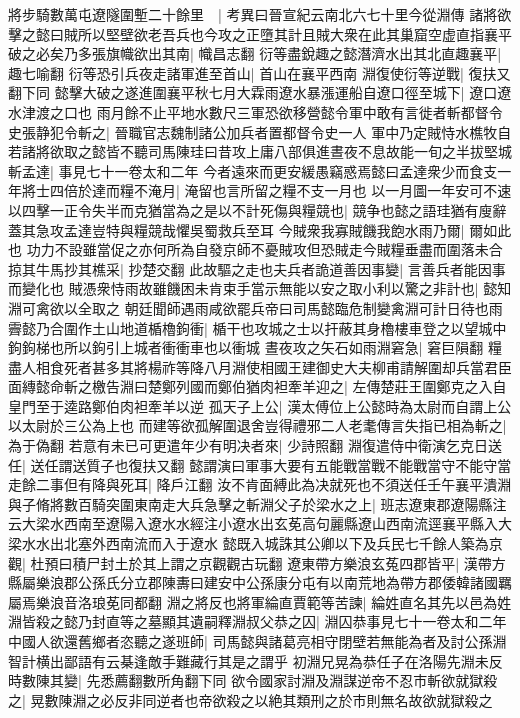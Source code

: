 將步騎數萬屯遼隧圍塹二十餘里　|{
	考異曰晉宣紀云南北六七十里今從淵傳}
諸將欲擊之懿曰賊所以堅壁欲老吾兵也今攻之正墮其計且賊大衆在此其巢窟空虚直指襄平破之必矣乃多張旗幟欲出其南|{
	幟昌志翻}
衍等盡銳趣之懿潛濟水出其北直趣襄平|{
	趣七喻翻}
衍等恐引兵夜走諸軍進至首山|{
	首山在襄平西南}
淵復使衍等逆戰|{
	復扶又翻下同}
懿擊大破之遂進圍襄平秋七月大霖雨遼水暴漲運船自遼口徑至城下|{
	遼口遼水津渡之口也}
雨月餘不止平地水數尺三軍恐欲移營懿令軍中敢有言徙者斬都督令史張静犯令斬之|{
	晉職官志魏制諸公加兵者置都督令史一人}
軍中乃定賊恃水樵牧自若諸將欲取之懿皆不聽司馬陳珪曰昔攻上庸八部俱進晝夜不息故能一旬之半拔堅城斬孟達|{
	事見七十一卷太和二年}
今者遠來而更安緩愚竊惑焉懿曰孟達衆少而食支一年將士四倍於達而糧不淹月|{
	淹留也言所留之糧不支一月也}
以一月圖一年安可不速以四擊一正令失半而克猶當為之是以不計死傷與糧競也|{
	競争也懿之語珪猶有廋辭蓋其急攻孟達豈特與糧競哉懼吳蜀救兵至耳}
今賊衆我寡賊饑我飽水雨乃爾|{
	爾如此也}
功力不設雖當促之亦何所為自發京師不憂賊攻但恐賊走今賊糧垂盡而圍落未合掠其牛馬抄其樵采|{
	抄楚交翻}
此故驅之走也夫兵者詭道善因事變|{
	言善兵者能因事而變化也}
賊憑衆恃雨故雖饑困未肯束手當示無能以安之取小利以驚之非計也|{
	懿知淵可禽欲以全取之}
朝廷聞師遇雨咸欲罷兵帝曰司馬懿臨危制變禽淵可計日待也雨霽懿乃合圍作土山地道楯櫓鉤衝|{
	楯干也攻城之士以扞蔽其身櫓樓車登之以望城中鉤鉤梯也所以鉤引上城者衝衝車也以衝城}
晝夜攻之矢石如雨淵窘急|{
	窘巨隕翻}
糧盡人相食死者甚多其將楊祚等降八月淵使相國王建御史大夫柳甫請解圍却兵當君臣面縳懿命斬之檄告淵曰楚鄭列國而鄭伯猶肉袒牽羊迎之|{
	左傳楚莊王圍鄭克之入自皇門至于逵路鄭伯肉袒牽羊以逆}
孤天子上公|{
	漢太傅位上公懿時為太尉而自謂上公以太尉於三公為上也}
而建等欲孤解圍退舍豈得禮邪二人老耄傳言失指已相為斬之|{
	為于偽翻}
若意有未已可更遣年少有明决者來|{
	少詩照翻}
淵復遣侍中衛演乞克日送任|{
	送任謂送質子也復扶又翻}
懿謂演曰軍事大要有五能戰當戰不能戰當守不能守當走餘二事但有降與死耳|{
	降戶江翻}
汝不肯面縛此為决就死也不須送任壬午襄平潰淵與子脩將數百騎突圍東南走大兵急擊之斬淵父子於梁水之上|{
	班志遼東郡遼陽縣注云大梁水西南至遼陽入遼水水經注小遼水出玄莬高句麗縣遼山西南流逕襄平縣入大梁水水出北塞外西南流而入于遼水}
懿既入城誅其公卿以下及兵民七千餘人築為京觀|{
	杜預曰積尸封土於其上謂之京觀觀古玩翻}
遼東帶方樂浪玄菟四郡皆平|{
	漢帶方縣屬樂浪郡公孫氏分立郡陳夀曰建安中公孫康分屯有以南荒地為帶方郡倭韓諸國羈屬焉樂浪音洛琅莬同都翻}
淵之將反也將軍綸直賈範等苦諫|{
	綸姓直名其先以邑為姓}
淵皆殺之懿乃封直等之墓顯其遺嗣釋淵叔父恭之囚|{
	淵囚恭事見七十一卷太和二年}
中國人欲還舊鄉者恣聽之遂班師|{
	司馬懿與諸葛亮相守閉壁若無能為者及討公孫淵智計横出鄙語有云棊逢敵手難藏行其是之謂乎}
初淵兄晃為恭任子在洛陽先淵未反時數陳其變|{
	先悉薦翻數所角翻下同}
欲令國家討淵及淵謀逆帝不忍市斬欲就獄殺之|{
	晃數陳淵之必反非同逆者也帝欲殺之以絶其類刑之於市則無名故欲就獄殺之}
